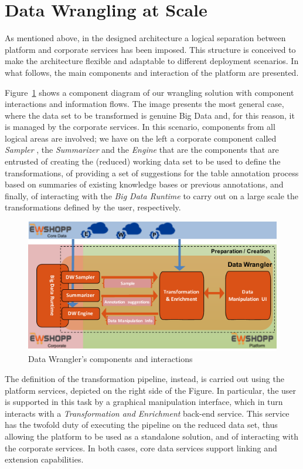 \section{Data Wrangling at Scale}\label{sec:architecture}
As mentioned above, in the designed architecture a logical separation between platform and corporate services has been imposed. This structure is conceived to make the architecture flexible and adaptable to different deployment scenarios. 
In what follows, the main components and interaction of the platform are presented. 

Figure~\ref{fig:wrangler} shows a component diagram of our wrangling solution with component interactions and information flows. 
The image presents the most general case, where the data set to be transformed is genuine Big Data and, for this reason, it is managed by the corporate services. 
In this scenario, components from all logical areas are involved; we have on the left a corporate component called \textit{Sampler} , the \textit{Summarizer} and the \textit{Engine} that are the components that are entrusted of creating the (reduced) working data set to be used to define the transformations, of providing a set of suggestions for the table annotation process based on summaries of existing knowledge bases or previous annotations, and finally, of interacting with the \textit{Big Data Runtime} to carry out on a large scale the transformations defined by the user, respectively. 
\begin{figure}[t]
    \centering
    \includegraphics[width=\columnwidth]{figs/Wrangler.pdf}
    \caption{Data Wrangler's components and interactions}
    \label{fig:wrangler} 
\end{figure}  
The definition of the transformation pipeline, instead, is carried out using the platform services, depicted on the right side of the Figure. In particular, the user is supported in this task by a graphical manipulation interface, which in turn interacts with a \textit{Transformation and Enrichment} back-end service. This service has the twofold duty of executing the pipeline on the reduced data set, thus allowing the platform to be used as a standalone solution, and of interacting with the corporate services. In both cases, core data services support linking and extension capabilities. 

